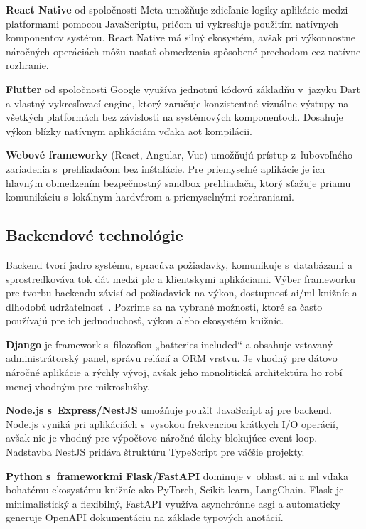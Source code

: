 \textbf{React Native} od spoločnosti Meta umožňuje zdieľanie logiky aplikácie
medzi platformami pomocou JavaScriptu, pričom \acrshort{ui} vykresľuje použitím
natívnych komponentov systému. React Native má silný ekosystém, avšak pri
výkonnostne náročných operáciách môžu nastať obmedzenia spôsobené
prechodom cez natívne rozhranie.

\textbf{Flutter} od spoločnosti Google využíva jednotnú kódovú základňu
v~jazyku Dart a vlastný vykresľovací engine, ktorý zaručuje konzistentné
vizuálne výstupy na všetkých platformách bez závislosti na systémových
komponentoch. Dosahuje výkon blízky natívnym aplikáciám vďaka
\acrshort{aot} kompilácii.

\textbf{Webové frameworky} (React, Angular, Vue) umožňujú prístup
z~ľubovoľného zariadenia s~prehliadačom bez inštalácie. Pre priemyselné
aplikácie je ich hlavným obmedzením bezpečnostný sandbox prehliadača,
ktorý sťažuje priamu komunikáciu s~lokálnym hardvérom a priemyselnými
rozhraniami.

\subsection{Backendové technológie}
Backend tvorí jadro systému, spracúva požiadavky, komunikuje s~databázami a
sprostredkováva tok dát medzi \acrshort{plc} a klientskymi aplikáciami. Výber
frameworku pre tvorbu backendu závisí od požiadaviek na výkon, dostupnosť
\acrshort{ai}/\acrshort{ml} knižníc a dlhodobú udržateľnosť~\cite{t09}. Pozrime
sa na vybrané možnosti, ktoré sa často používajú pre ich jednoduchosť, výkon
alebo ekosystém knižníc.

\textbf{Django} je framework s~filozofiou „batteries included“ a
obsahuje vstavaný administrátorský panel, správu relácií a ORM vrstvu. Je vhodný
pre dátovo náročné aplikácie a rýchly vývoj, avšak jeho monolitická
architektúra ho robí menej vhodným pre mikroslužby.

\textbf{Node.js s~Express/NestJS} umožňuje použiť JavaScript aj pre backend.
Node.js vyniká pri aplikáciách s~vysokou frekvenciou krátkych I/O operácií, avšak nie je vhodný pre výpočtovo náročné úlohy
blokujúce event loop. Nadstavba NestJS pridáva štruktúru TypeScript pre
väčšie projekty.

\textbf{Python s~frameworkmi Flask/FastAPI} dominuje v~oblasti
\acrshort{ai} a \acrshort{ml} vďaka bohatému ekosystému knižníc ako PyTorch, Scikit-learn,
LangChain. Flask je minimalistický a flexibilný, FastAPI využíva asynchrónne
\acrshort{asgi} a automaticky generuje OpenAPI dokumentáciu na základe typových anotácií.

